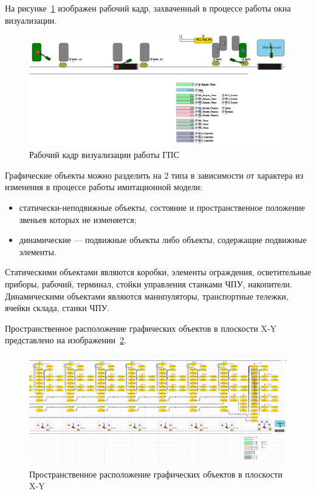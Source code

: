 На рисунке~\ref{fig:graphics} изображен рабочий кадр, захваченный в процессе работы окна визуализации.

\begin{figure}[ht]
    \includegraphics[width=1\linewidth]{Figures/graphics.png}
    \caption{Рабочий кадр визуализации работы ГПС}
    \label{fig:graphics}
\end{figure}

Графические объекты можно разделить на 2 типа в зависимости от характера из изменения в процессе работы имитационной модели:

\begin{itemize}
    \item статически-неподвижные объекты, состояние и пространственное положение звеньев которых не изменяется;
    \item динамические --- подвижные объекты либо объекты, содержащие подвижные элементы.
\end{itemize}

Статическими объектами являются коробки, элементы ограждения, осветительные приборы, рабочий, терминал, стойки управления станками ЧПУ, накопители. Динамическими объектами являются манипуляторы, транспортные тележки, ячейки склада, станки ЧПУ.

Пространственное расположение графических объектов в плоскости X-Y представлено на изображении~\ref{fig:space}.

\begin{figure}[ht]
    \includegraphics[width=1\linewidth]{Figures/space.png}
    \caption{Пространственное расположение графических объектов в плоскости X-Y}
    \label{fig:space}
\end{figure}

